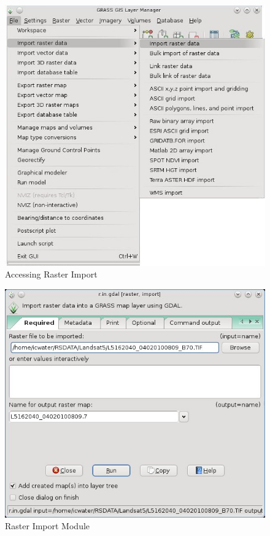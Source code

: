 \begin{figure}[htbp]
   \centering
   \includegraphics[scale=0.4]{gipe009.png}
   \caption{Accessing Raster Import}
   \label{fig:gipe009}
\end{figure}

\begin{figure}[htbp]
   \centering
   \includegraphics[scale=0.4]{gipe010.png}
   \caption{Raster Import Module}
   \label{fig:gipe010}
\end{figure}

